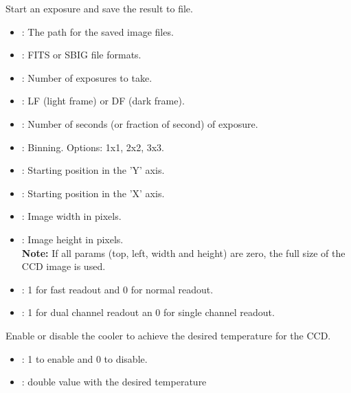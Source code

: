\documentclass[a4paper,english]{article}
\begin{document}
\begin{Description}\setlength{\itemsep}{0cm}
\item[\Arg{capture}] Start an exposure and save the result to file.

	                  
	
	\begin{itemize}
		\item {}: The path for the saved image files.
		\item {}: FITS or SBIG file formats.
		\item {}: Number of exposures to take.
		\item {}: LF (light frame) or DF (dark frame).
		\item {}: Number of seconds (or fraction of second) of exposure.
		\item {}: Binning. Options: 1x1, 2x2, 3x3.
		\item {}: Starting position in the 'Y' axis.
		\item {}: Starting position in the 'X' axis.
		\item {}: Image width in pixels.
		\item {}: Image height in pixels. \\
		
		\textbf{Note:} If all params (top, left, width and height) are zero, the full size of the CCD image is used. \\
		
		\item {}: 1 for fast readout and 0 for normal readout.
		\item {}: 1 for dual channel readout an 0 for single channel readout.
	\end{itemize}
	
\item[\Arg{settemp}] Enable or disable the cooler to achieve the desired temperature for the CCD. 

	      
	
	\begin{itemize}
		\item {}: 1 to enable and 0 to disable.
		\item {}: double value with the desired temperature
	\end{itemize}
	

\end{Description}
\end{document}
